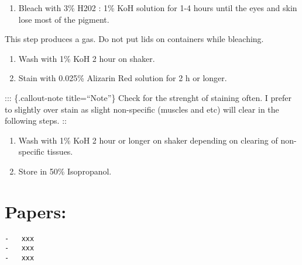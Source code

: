 \documentclass[
  letterpaper,
  DIV=11,
  numbers=noendperiod]{scrreprt}
\providecommand{\tightlist}{%
  \setlength{\itemsep}{0pt}\setlength{\parskip}{0pt}}\usepackage{longtable,booktabs,array}
\begin{document}
\begin{enumerate}
\def\labelenumi{\arabic{enumi}.}
\setcounter{enumi}{2}
\tightlist
\item
  Bleach with 3\% H202 : 1\% KoH solution for 1-4 hours until the eyes
  and skin lose most of the pigment.
\end{enumerate}

\begin{tcolorbox}[enhanced jigsaw, toprule=.15mm, breakable, coltitle=black, leftrule=.75mm, title=\textcolor{quarto-callout-note-color}{\faInfo}\hspace{0.5em}{Warning}, bottomrule=.15mm, toptitle=1mm, bottomtitle=1mm, colframe=quarto-callout-note-color-frame, opacityback=0, colback=white, opacitybacktitle=0.6, colbacktitle=quarto-callout-note-color!10!white, rightrule=.15mm, titlerule=0mm, arc=.35mm, left=2mm]

This step produces a gas. Do not put lids on containers while bleaching.

\end{tcolorbox}

\begin{enumerate}
\def\labelenumi{\arabic{enumi}.}
\setcounter{enumi}{3}
\item
  Wash with 1\% KoH 2 hour on shaker.
\item
  Stain with 0.025\% Alizarin Red solution for 2 h or longer.
\end{enumerate}

::: \{.callout-note title=``Note''\} Check for the strenght of staining
often. I prefer to slightly over stain as slight non-specific (muscles
and etc) will clear in the following steps. ::

\begin{enumerate}
\def\labelenumi{\arabic{enumi}.}
\setcounter{enumi}{5}
\item
  Wash with 1\% KoH 2 hour or longer on shaker depending on clearing of
  non-specific tissues.
\item
  Store in 50\% Isopropanol.
\end{enumerate}

\hypertarget{papers-1}{%
\section{Papers:}\label{papers-1}}

\begin{verbatim}
-   xxx
-   xxx
-   xxx
\end{verbatim}
\end{document}
